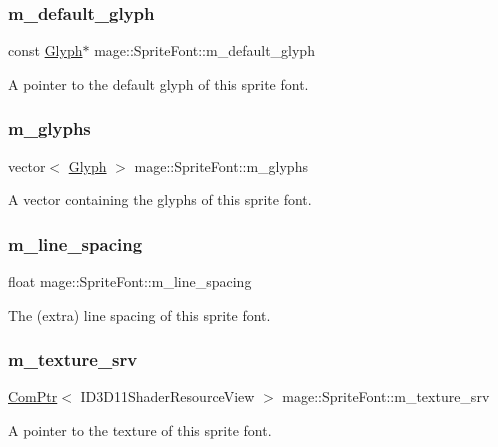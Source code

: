 \subsubsection{\texorpdfstring{m\+\_\+default\+\_\+glyph}{m\_default\_glyph}}
{\footnotesize\ttfamily const \hyperlink{structmage_1_1_glyph}{Glyph}$\ast$ mage\+::\+Sprite\+Font\+::m\+\_\+default\+\_\+glyph\hspace{0.3cm}{\ttfamily [private]}}

A pointer to the default glyph of this sprite font. \hypertarget{classmage_1_1_sprite_font_acf4efc927a2ca3fc0eb297ed080ddfbb}{}\label{classmage_1_1_sprite_font_acf4efc927a2ca3fc0eb297ed080ddfbb} 
\subsubsection{\texorpdfstring{m\+\_\+glyphs}{m\_glyphs}}
{\footnotesize\ttfamily vector$<$ \hyperlink{structmage_1_1_glyph}{Glyph} $>$ mage\+::\+Sprite\+Font\+::m\+\_\+glyphs\hspace{0.3cm}{\ttfamily [private]}}

A vector containing the glyphs of this sprite font. \hypertarget{classmage_1_1_sprite_font_a2b6de0c210a7cf5c72dd1bb69bff7a3b}{}\label{classmage_1_1_sprite_font_a2b6de0c210a7cf5c72dd1bb69bff7a3b} 
\subsubsection{\texorpdfstring{m\+\_\+line\+\_\+spacing}{m\_line\_spacing}}
{\footnotesize\ttfamily float mage\+::\+Sprite\+Font\+::m\+\_\+line\+\_\+spacing\hspace{0.3cm}{\ttfamily [private]}}

The (extra) line spacing of this sprite font. \hypertarget{classmage_1_1_sprite_font_a0f52f8845cb204d4ca3b3f3020df0029}{}\label{classmage_1_1_sprite_font_a0f52f8845cb204d4ca3b3f3020df0029} 
\subsubsection{\texorpdfstring{m\+\_\+texture\+\_\+srv}{m\_texture\_srv}}
{\footnotesize\ttfamily \hyperlink{namespacemage_ae74f374780900893caa5555d1031fd79}{Com\+Ptr}$<$ I\+D3\+D11\+Shader\+Resource\+View $>$ mage\+::\+Sprite\+Font\+::m\+\_\+texture\+\_\+srv\hspace{0.3cm}{\ttfamily [private]}}

A pointer to the texture of this sprite font. 